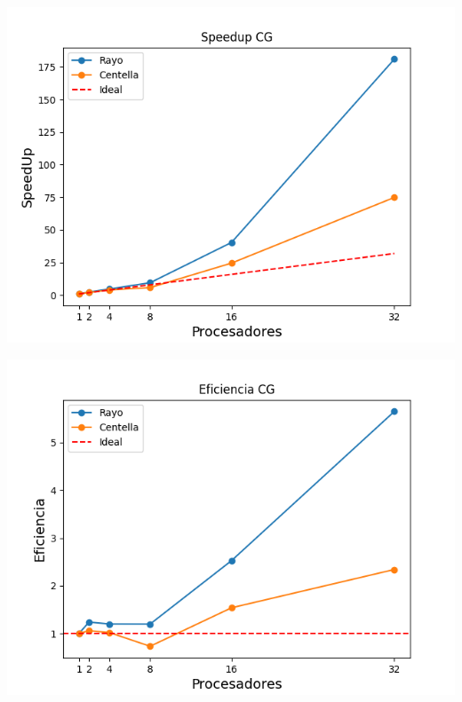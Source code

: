 \begin{center}
 \centering
 \begin{minipage}[b]{.49\textwidth}
  \includegraphics[width=1\linewidth]{plots/speed-up-cg.png}
  \label{cg:speedup}
 \end{minipage}
 \begin{minipage}[b]{.49\textwidth}
  \includegraphics[width=1\linewidth]{plots/efficiency-cg.png}
    \label{cg:eficiencia}
 \end{minipage}
\end{center}

